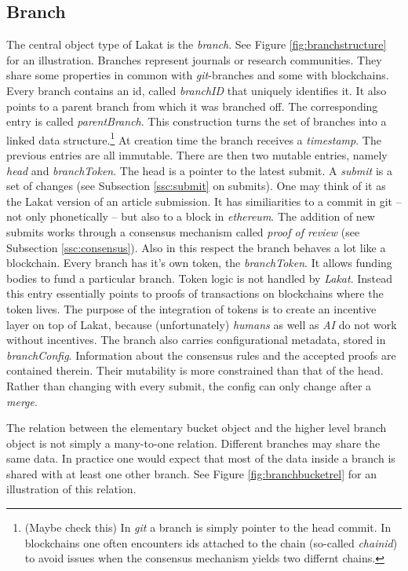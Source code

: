 \documentclass[14pt]{article}
\newcommand{\remark}[1]{{\color{purple} (#1)}}
\begin{document}
\subsection{Branch}
The central object type of Lakat is the \textit{branch}. See Figure \ref{fig:branchstructure} for an illustration. Branches represent journals or research communities. They share some properties in common with \textit{git}-branches and some with blockchains. Every branch contains an id, called \textit{branchID} that uniquely identifies it. It also points to a parent branch from which it was branched off. The corresponding entry is called \textit{parentBranch}. This construction turns the set of branches into a linked data structure.\footnote{\remark{Maybe check this} In \textit{git} a branch is simply pointer to the head commit. In blockchains one often encounters ids attached to the chain (so-called \textit{chainid}) to avoid issues when the consensus mechanism yields two differnt chains.} At creation time the branch receives a \textit{timestamp}. The previous entries are all immutable. There are then two mutable entries, namely \textit{head} and \textit{branchToken}. The head is a pointer to the latest submit. A \textit{submit} is a set of changes (see Subsection \ref{ssc:submit} on submits). One may think of it as the Lakat version of an article submission. It has similiarities to a commit in git -- not only phonetically -- but also to a block in \textit{ethereum}. The addition of new submits works through a consensus mechanism called \textit{proof of review} (see Subsection \ref{ssc:consensus}). Also in this respect the branch behaves a lot like a blockchain. Every branch has it's own token, the \textit{branchToken}. It allows funding bodies to fund a particular branch. Token logic is not handled by \textit{Lakat}. Instead this entry essentially points to proofs of transactions on blockchains where the token lives. The purpose of the integration of tokens is to create an incentive layer on top of Lakat, because (unfortunately) \textit{humans} as well as \textit{AI} do not work without incentives.
The branch also carries configurational metadata, stored in \textit{branchConfig}. Information about the consensus rules and the accepted proofs are contained therein. Their mutability is more constrained than that of the head. Rather than changing with every submit, the config can only change after a \textit{merge}.

The relation between the elementary bucket object and the higher level branch object is not simply a many-to-one relation. Different branches may share the same data. In practice one would expect that most of the data inside a branch is shared with at least one other branch. See Figure \ref{fig:branchbucketrel} for an illustration of this relation.
\end{document}

